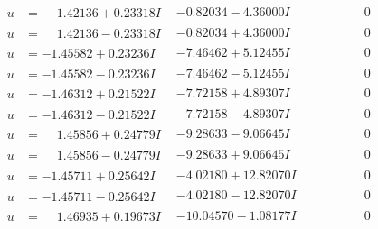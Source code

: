 \documentclass[1p]{elsarticle_modified}
\theoremstyle{definition}
\begin{document}
$$\begin{array}{c|c|c}
\begin{aligned}
u &= \phantom{-}1.42136 + 0.23318 I\end{aligned}
 & -0.82034 - 4.36000 I & \phantom{-0.000000 } 0 \\ \hline\begin{aligned}
u &= \phantom{-}1.42136 - 0.23318 I\end{aligned}
 & -0.82034 + 4.36000 I & \phantom{-0.000000 } 0 \\ \hline\begin{aligned}
u &= -1.45582 + 0.23236 I\end{aligned}
 & -7.46462 + 5.12455 I & \phantom{-0.000000 } 0 \\ \hline\begin{aligned}
u &= -1.45582 - 0.23236 I\end{aligned}
 & -7.46462 - 5.12455 I & \phantom{-0.000000 } 0 \\ \hline\begin{aligned}
u &= -1.46312 + 0.21522 I\end{aligned}
 & -7.72158 + 4.89307 I & \phantom{-0.000000 } 0 \\ \hline\begin{aligned}
u &= -1.46312 - 0.21522 I\end{aligned}
 & -7.72158 - 4.89307 I & \phantom{-0.000000 } 0 \\ \hline\begin{aligned}
u &= \phantom{-}1.45856 + 0.24779 I\end{aligned}
 & -9.28633 - 9.06645 I & \phantom{-0.000000 } 0 \\ \hline\begin{aligned}
u &= \phantom{-}1.45856 - 0.24779 I\end{aligned}
 & -9.28633 + 9.06645 I & \phantom{-0.000000 } 0 \\ \hline\begin{aligned}
u &= -1.45711 + 0.25642 I\end{aligned}
 & -4.02180 + 12.82070 I & \phantom{-0.000000 } 0 \\ \hline\begin{aligned}
u &= -1.45711 - 0.25642 I\end{aligned}
 & -4.02180 - 12.82070 I & \phantom{-0.000000 } 0 \\ \hline\begin{aligned}
u &= \phantom{-}1.46935 + 0.19673 I\end{aligned}
 & -10.04570 - 1.08177 I & \phantom{-0.000000 } 0 \\ \hline\begin{aligned}

\end{aligned}
\end{array}$$
\end{document}
